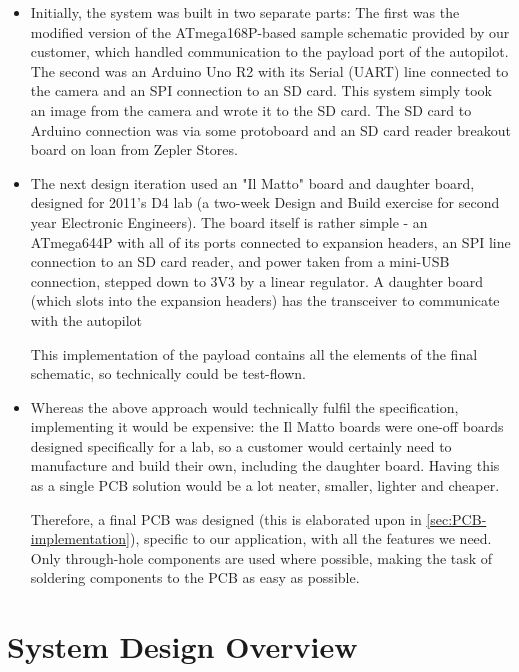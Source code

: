 \begin{itemize}
\item Initially, the system was built in two separate parts: The first was 
the modified version of the ATmega168P-based sample schematic provided by 
our customer, which handled communication to the payload port of the 
autopilot. The second was an Arduino Uno R2 with its Serial (UART) line 
connected to the camera and an SPI connection to an SD card. This system 
simply took an image from the camera and wrote it to the SD card. The SD card 
to Arduino connection was via some protoboard and an SD card reader breakout 
board on loan from Zepler Stores.
\item The next design iteration used an "Il Matto" board and daughter board, 
designed for 2011's D4 lab (a two-week Design and Build exercise for second 
year Electronic Engineers). The board itself is rather simple - an ATmega644P 
with all of its ports connected to expansion headers, an SPI line connection 
to an SD card reader, and power taken from a mini-USB connection, stepped 
down to 3V3 by a linear regulator. A daughter board (which slots into the 
expansion headers) has the transceiver to communicate with the autopilot

This implementation of the payload contains all the elements of the final 
schematic, so technically could be test-flown.
\item Whereas the above approach would technically fulfil the specification, 
implementing it would be expensive: the Il Matto boards were one-off boards 
designed specifically for a lab, so a customer would certainly need to 
manufacture and build their own, including the daughter board. Having this as 
a single PCB solution would be a lot neater, smaller, lighter and cheaper.

Therefore, a final PCB was designed (this is elaborated upon in 
\ref{sec:PCB-implementation}), specific to our application, with all the 
features we need. Only through-hole components are used where possible, 
making the task of soldering components to the PCB as easy as possible.
\end{itemize}

\section{System Design Overview}

